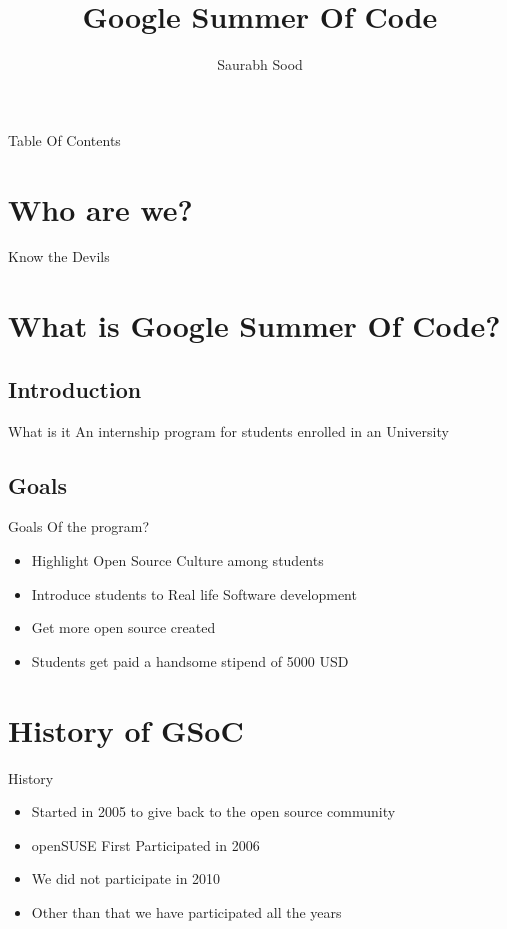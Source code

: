 \documentclass{beamer}
\begin{document}
\title{Google Summer Of Code}
\author{Saurabh Sood}

\begin{frame}
\titlepage
\end{frame}

\begin{frame}{Table Of Contents}
\tableofcontents
\end{frame}

\section{Who are we?}
\begin{frame}{Know the Devils}

\end{frame}


\section{What is Google Summer Of Code?}
\subsection{Introduction}
\begin{frame}{What is it}
An internship program for students enrolled in an University
\end{frame}

\subsection{Goals}
\begin{frame}{Goals Of the program?}
\pause
\begin{itemize}
\item Highlight Open Source Culture among students \pause
\item Introduce students to Real life Software development \pause
\item Get more open source created \pause
\item Students get paid a handsome stipend of 5000 USD 
\end{itemize}
\end{frame}

\section{History of GSoC}
\begin{frame}{History}\pause
\begin{itemize}
\item Started in 2005 to give back to the open source community \pause
\item openSUSE First Participated in 2006 \pause
\item We did not participate in 2010 \pause
\item Other than that we have participated all the years 
\end{itemize}
\end{frame}
\end{document}

